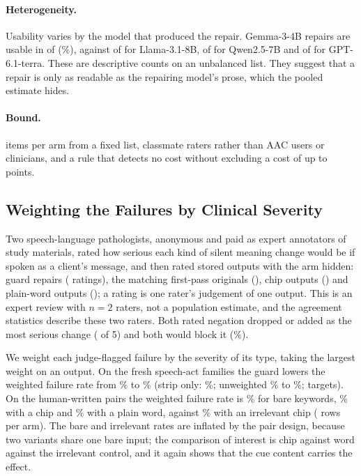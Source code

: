 \paragraph{Heterogeneity.}
Usability varies by the model that produced the repair. Gemma-3-4B repairs are usable in \jmpOneSevenRepGemmaUsableK{} of \jmpOneSevenRepGemmaUsableN{} (\jmpOneSevenRepGemmaUsable{}\%), against \jmpOneSevenRepLlamaUsableK{} of \jmpOneSevenRepLlamaUsableN{} for Llama-3.1-8B, \jmpOneSevenRepQwenSUsableK{} of \jmpOneSevenRepQwenSUsableN{} for Qwen2.5-7B and \jmpOneSevenRepTerraUsableK{} of \jmpOneSevenRepTerraUsableN{} for GPT-6.1-terra. These are descriptive counts on an unbalanced list. They suggest that a repair is only as readable as the repairing model's prose, which the pooled estimate hides.

\paragraph{Bound.}
\jmpOneSevenItemsPerArm{} items per arm from a fixed list, classmate raters rather than AAC users or clinicians, and a rule that detects no cost without excluding a cost of up to \jmpOneSevenDiffUsableLo{} points.

\subsection{Weighting the Failures by Clinical Severity}\label{sec:severity}

Two speech-language pathologists, anonymous and paid as expert annotators of study materials, rated how serious each kind of silent meaning change would be if spoken as a client's message, and then rated stored outputs with the arm hidden: guard repairs (\jmslpAccRepairN{} ratings), the matching first-pass originals (\jmslpAccOrigN{}), chip outputs (\jmslpAccChipN{}) and plain-word outputs (\jmslpAccWordN{}); a rating is one rater's judgement of one output. This is an expert review with $n=2$ raters, not a population estimate, and the agreement statistics describe these two raters. Both rated negation dropped or added as the most serious change (\jmslpNegSeverity{} of 5) and both would block it (\jmslpNegBlock{}\%).

We weight each judge-flagged failure by the severity of its type, taking the largest weight on an output. On the fresh speech-act families the guard lowers the weighted failure rate from \jmslpWGuardBase{}\% to \jmslpWGuardG{}\% (strip only: \jmslpWGuardGs{}\%; unweighted \jmslpUGuardBase{}\% to \jmslpUGuardG{}\%; \jmslpWcN{} targets). On the human-written pairs the weighted failure rate is \jmslpWCueBare{}\% for bare keywords, \jmslpWCueChip{}\% with a chip and \jmslpWCueWord{}\% with a plain word, against \jmslpWCueIrrel{}\% with an irrelevant chip (\jmslpHwN{} rows per arm). The bare and irrelevant rates are inflated by the pair design, because two variants share one bare input; the comparison of interest is chip against word against the irrelevant control, and it again shows that the cue content carries the effect.

